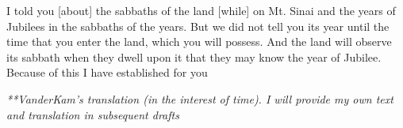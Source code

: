 \begin{translation}
    I told you [about] the sabbaths of the land [while] on Mt. Sinai and the years of
    Jubilees in the sabbaths of the years. But we did not tell you its year
    until the time that you enter the land, which you will possess.
    And the land will observe its sabbath when they dwell upon it
    that they may know the year of Jubilee.
    Because of this I have established for you

    \emph{**VanderKam's translation (in the interest of time). I will provide my own text and translation in subsequent drafts}
\end{translation}